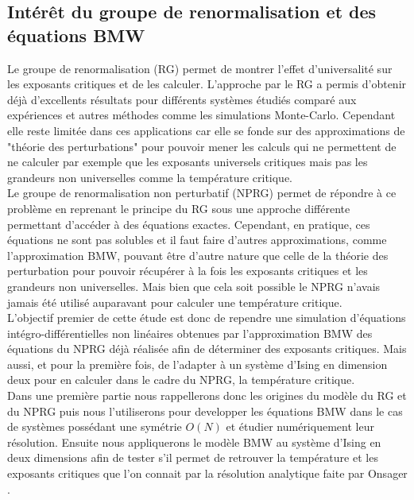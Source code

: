 \documentclass[10pt]{article}
\begin{document}
\begin{multicols}{2}
\subsection{Intérêt du groupe de renormalisation et des équations BMW}

Le groupe de renormalisation (RG) permet de montrer l'effet d'universalité sur les exposants critiques et de les calculer. L'approche par le RG a permis d'obtenir déjà d'excellents résultats \cite{} pour différents systèmes étudiés comparé aux expériences et autres méthodes comme les simulations Monte-Carlo. Cependant elle reste limitée dans ces applications car elle se fonde sur des approximations de "théorie des perturbations" pour pouvoir mener les calculs qui ne permettent de ne calculer par exemple que les exposants universels critiques mais pas les grandeurs non universelles comme la température critique.\\

Le groupe de renormalisation non perturbatif (NPRG) permet de répondre à ce problème en reprenant le principe du RG sous une approche différente permettant d'accéder à des équations exactes. Cependant, en pratique, ces équations ne sont pas solubles et il faut faire d'autres approximations, comme l'approximation BMW, pouvant être d'autre nature que celle de la théorie des perturbation pour pouvoir récupérer à la fois les exposants critiques et les grandeurs non universelles. Mais bien que cela soit possible le NPRG n'avais jamais été utilisé auparavant pour calculer une température critique. \\

L'objectif premier de cette étude est donc de rependre une simulation d'équations intégro-différentielles non linéaires obtenues par l'approximation BMW des équations du NPRG déjà réalisée \cite{LeonardThesis} afin de déterminer des exposants critiques. Mais aussi, et pour la première fois, de l'adapter à un système d'Ising en dimension deux pour en calculer dans le cadre du NPRG, la température critique. \\

Dans une première partie nous rappellerons donc les origines du modèle du RG et du NPRG puis nous l'utiliserons pour developper les équations BMW dans le cas de systèmes possédant une symétrie $O(N)$ et étudier numériquement leur résolution. Ensuite nous appliquerons le modèle BMW au système d'Ising en deux dimensions afin de tester s'il permet de retrouver la température et les exposants critiques que l'on connait par la résolution analytique faite par Onsager \cite{Onsager}. 



\end{multicols}
\end{document}
